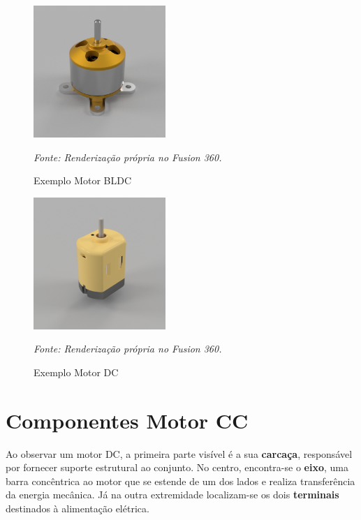 \documentclass[11pt]{article}
\begin{document}
\begin{multicols}{2}
    
    \begin{figure}[H]
        \centering
        \includegraphics[width=5cm]{Renderizações/1 - BLDC.png}
        \caption{Exemplo Motor BLDC}
        \footnotesize \textit{Fonte: Renderização própria no Fusion 360.}
        \label{1-BLDC}
    \end{figure}

    \begin{figure}[H]
        \centering
        \includegraphics[width=5cm]{Renderizações/1 - DC.png}
        \caption{Exemplo Motor DC}
        \footnotesize \textit{Fonte: Renderização própria no Fusion 360.}
        \label{1-DC}
    \end{figure}

\end{multicols}

\section{Componentes Motor CC}

    \noindent Ao observar um motor DC, a primeira parte visível é a sua \textbf{carcaça}, responsável por fornecer suporte estrutural ao conjunto. 
    No centro, encontra-se o \textbf{eixo}, uma barra concêntrica ao motor que se estende de um dos lados e realiza transferência da energia mecânica. Já na 
    outra extremidade localizam-se os dois \textbf{terminais} destinados à alimentação elétrica.
\end{document}
